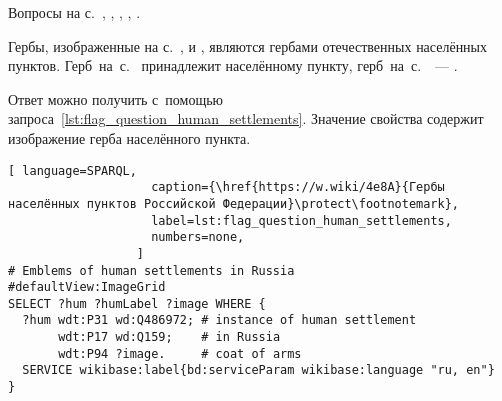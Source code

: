 \begin{task}
\label{answer:flag_human_settlements}
    \AnswerBackref
    Вопросы на с.~\pageref{fig:flag_question_human_settlements1}, \pageref{fig:flag_question_human_settlements2}, \pageref{fig:flag_question_human_settlements3}, \pageref{fig:flag_question_human_settlements4}, \pageref{fig:flag_question_human_settlements5}.

Гербы, изображенные на с.~\pageref{fig:flag_question_human_settlements1}, 
    \pageref{fig:flag_question_human_settlements2} и 
    \pageref{fig:flag_question_human_settlements5}, 
    являются гербами отечественных населённых пунктов. 
    Герб~на~с.~\pageref{fig:flag_question_human_settlements3} 
    принадлежит  населённому пункту, 
    герб~на~с.~\pageref{fig:flag_question_human_settlements4}~--- 
    . 

Ответ можно получить с~помощью запроса~\ref{lst:flag_question_human_settlements}. 
    Значение свойства  
    содержит изображение герба населённого пункта.

\newpage
{}
\begin{lstlisting}[ language=SPARQL, 
                    caption={\href{https://w.wiki/4e8A}{Гербы населённых пунктов Российской Федерации}\protect\footnotemark},
                    label=lst:flag_question_human_settlements,
                    numbers=none,
                  ]
# Emblems of human settlements in Russia
#defaultView:ImageGrid
SELECT ?hum ?humLabel ?image WHERE {
  ?hum wdt:P31 wd:Q486972; # instance of human settlement
       wdt:P17 wd:Q159;    # in Russia
       wdt:P94 ?image.     # coat of arms
  SERVICE wikibase:label{bd:serviceParam wikibase:language "ru, en"}
}
\end{lstlisting}
\end{task}




